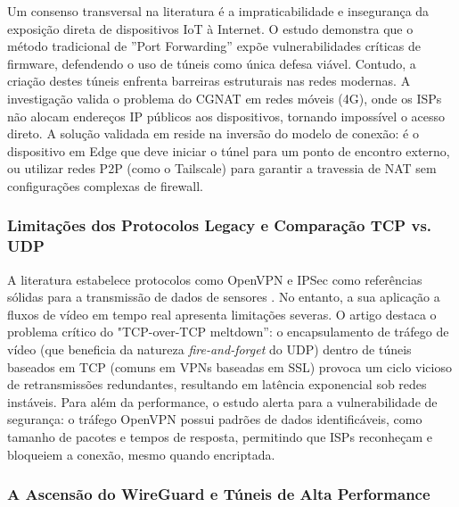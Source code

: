 Um consenso transversal na literatura é a impraticabilidade e insegurança da exposição direta de dispositivos \gls{IoT} à Internet. O estudo \cite{bugeja_investigation_2018} demonstra que o método tradicional de ''Port Forwarding'' expõe vulnerabilidades críticas de firmware, defendendo o uso de túneis como única defesa viável. Contudo, a criação destes túneis enfrenta barreiras estruturais nas redes modernas. A investigação \cite{boonprasert_low-cost_2024} valida o problema do \gls{CGNAT} em redes móveis (4G), onde os \glspl{ISP} não alocam endereços \gls{IP} públicos aos dispositivos, tornando impossível o acesso direto. A solução validada em \cite{hritcan_exposing_2024} reside na inversão do modelo de conexão: é o dispositivo em Edge que deve iniciar o túnel para um ponto de encontro externo, ou utilizar redes \gls{P2P} (como o Tailscale) para garantir a travessia de \gls{NAT} sem configurações complexas de firewall.

\subsubsection{Limitações dos Protocolos Legacy e Comparação TCP vs. UDP}

A literatura estabelece protocolos como OpenVPN e IPSec como referências sólidas para a transmissão de dados de sensores  \cite{fan_design_2019, guarino_data_2025}. No entanto, a sua aplicação a fluxos de vídeo em tempo real apresenta limitações severas.
O artigo \cite{asim_sect_2025} destaca o problema crítico do "TCP-over-TCP meltdown'': o encapsulamento de tráfego de vídeo (que beneficia da natureza \textit{fire-and-forget} do \gls{UDP}) dentro de túneis baseados em \gls{TCP} (comuns em \glspl{VPN} baseadas em \gls{SSL}) provoca um ciclo vicioso de retransmissões redundantes, resultando em latência exponencial sob redes instáveis.
Para além da performance, o estudo \cite{xue_openvpn_2024} alerta para a vulnerabilidade de segurança: o tráfego OpenVPN possui padrões de dados identificáveis, como tamanho de pacotes e tempos de resposta, permitindo que \glspl{ISP} reconheçam e bloqueiem a conexão, mesmo quando encriptada.

\subsubsection{A Ascensão do WireGuard e Túneis de Alta Performance}


